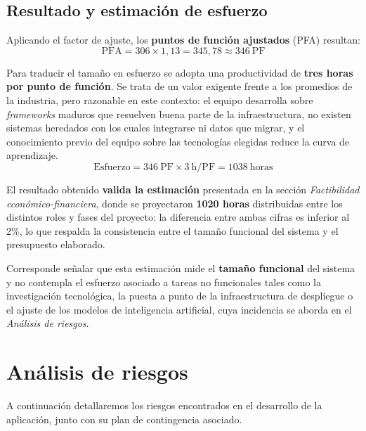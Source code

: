 \documentclass[a4paper,12pt]{article}
\begin{document}
    \subsection{Resultado y estimación de esfuerzo}
    \par Aplicando el factor de ajuste, los \textbf{puntos de función ajustados} (PFA) resultan:
    \[ \mathrm{PFA} = 306 \times 1{,}13 = 345{,}78 \approx 346\ \mathrm{PF} \]
    \par Para traducir el tamaño en esfuerzo se adopta una productividad de \textbf{tres horas por punto de función}. Se trata de un valor exigente frente a los promedios de la industria, pero razonable en este contexto: el equipo desarrolla sobre \textit{frameworks} maduros que resuelven buena parte de la infraestructura, no existen sistemas heredados con los cuales integrarse ni datos que migrar, y el conocimiento previo del equipo sobre las tecnologías elegidas reduce la curva de aprendizaje.
    \[ \mathrm{Esfuerzo} = 346\ \mathrm{PF} \times 3\ \mathrm{h/PF} = 1038\ \mathrm{horas} \]
    \par El resultado obtenido \textbf{valida la estimación} presentada en la sección \textit{Factibilidad económico-financiera}, donde se proyectaron \textbf{1020 horas} distribuidas entre los distintos roles y fases del proyecto: la diferencia entre ambas cifras es inferior al 2\%, lo que respalda la consistencia entre el tamaño funcional del sistema y el presupuesto elaborado.
    \par Corresponde señalar que esta estimación mide el \textbf{tamaño funcional} del sistema y no contempla el esfuerzo asociado a tareas no funcionales tales como la investigación tecnológica, la puesta a punto de la infraestructura de despliegue o el ajuste de los modelos de inteligencia artificial, cuya incidencia se aborda en el \textit{Análisis de riesgos}.

    \newpage

    \section{Análisis de riesgos}
    \par A continuación detallaremos los riesgos encontrados en el desarrollo de la aplicación, junto con su plan de contingencia asociado.
\end{document}
